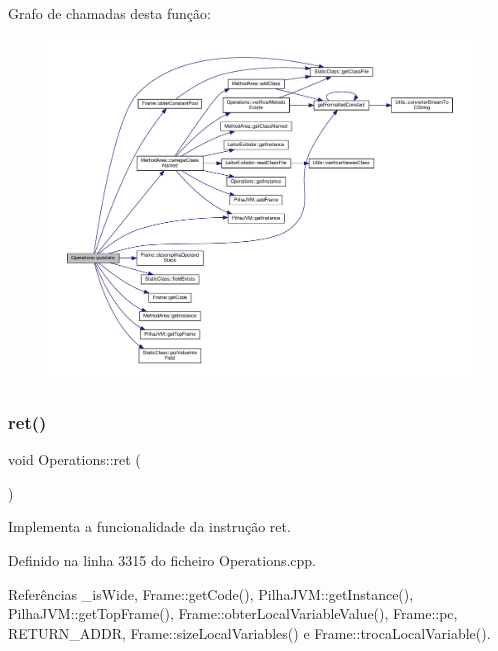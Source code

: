 Grafo de chamadas desta função\+:\nopagebreak
\begin{figure}[H]
\begin{center}
\leavevmode
\includegraphics[width=350pt]{classOperations_ac6791ccfd8adf30d8f80b1f679f0b146_cgraph}
\end{center}
\end{figure}
\mbox{\label{classOperations_a3e7225adafc030be5d6e1c2b0a963a9b}} 
\subsubsection{\texorpdfstring{ret()}{ret()}}
{\footnotesize\ttfamily void Operations\+::ret (\begin{DoxyParamCaption}{ }\end{DoxyParamCaption})\hspace{0.3cm}{\ttfamily [private]}}



Implementa a funcionalidade da instrução ret. 



Definido na linha 3315 do ficheiro Operations.\+cpp.



Referências \+\_\+is\+Wide, Frame\+::get\+Code(), Pilha\+J\+V\+M\+::get\+Instance(), Pilha\+J\+V\+M\+::get\+Top\+Frame(), Frame\+::obter\+Local\+Variable\+Value(), Frame\+::pc, R\+E\+T\+U\+R\+N\+\_\+\+A\+D\+DR, Frame\+::size\+Local\+Variables() e Frame\+::troca\+Local\+Variable().



